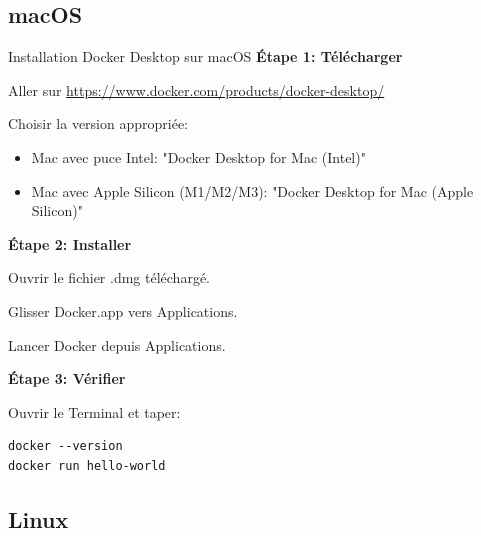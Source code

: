 \documentclass[10pt,a4paper]{article}
\begin{document}
\subsection{macOS}

\begin{exercicebox}{Installation Docker Desktop sur macOS}
\textbf{Étape 1: Télécharger}

Aller sur \url{https://www.docker.com/products/docker-desktop/}

Choisir la version appropriée:
\begin{itemize}
\item Mac avec puce Intel: "Docker Desktop for Mac (Intel)"
\item Mac avec Apple Silicon (M1/M2/M3): "Docker Desktop for Mac (Apple Silicon)"
\end{itemize}

\textbf{Étape 2: Installer}

Ouvrir le fichier .dmg téléchargé.

Glisser Docker.app vers Applications.

Lancer Docker depuis Applications.

\textbf{Étape 3: Vérifier}

Ouvrir le Terminal et taper:
\begin{verbatim}
docker --version
docker run hello-world
\end{verbatim}
\end{exercicebox}

\subsection{Linux}
\end{document}
